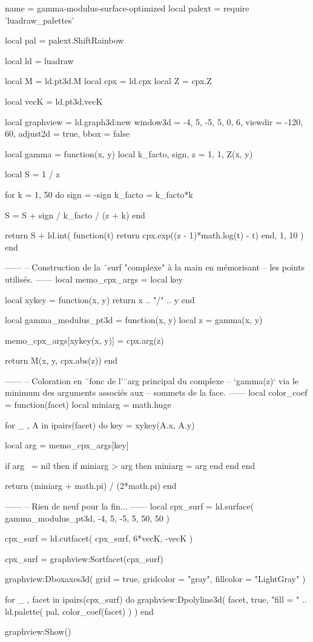\documentclass[border = 3pt]{standalone}
\begin{document}
\begin{luadraw*}{name = gamma-modulus-surface-optimized}
local palext = require 'luadraw_palettes'

local pal = palext.ShiftRainbow

local ld = luadraw

local M   = ld.pt3d.M
local cpx = ld.cpx
local Z   = cpx.Z

local vecK = ld.pt3d.vecK

local graphview = ld.graph3d:new{
  window3d = {-4, 5, -5, 5, 0, 6},
  viewdir  = {-120, 60},
  adjust2d = true,
  bbox     = false
}

local gamma = function(x, y)
  local k_facto, sign, z = 1, 1, Z(x, y)

  local S = 1 / z

  for k = 1, 50 do
    sign    = -sign
    k_facto = k_facto*k

    S = S + sign / k_facto / (z + k)
  end

  return S + ld.int(
    function(t)
      return cpx.exp((z - 1)*math.log(t) - t)
    end,
    1, 10
  )
end

------
-- Construction de la ¨surf "complexe" à la main en mémorisant
-- les points utilisés.
------
local memo_cpx_args = {}
local key

local xykey = function(x, y)
    return x .. "/" .. y
end

local gamma_modulus_pt3d = function(x, y)
  local z = gamma(x, y)

  memo_cpx_args[xykey(x, y)] = cpx.arg(z)

  return M(x, y, cpx.abs(z))
end

------
-- Coloration en ¨fonc de l'¨arg principal du complexe
-- `gamma(z)` via le minimum des arguments associés aux
-- sommets de la face.
------
local color_coef = function(facet)
  local miniarg = math.huge

  for _ , A in ipairs(facet) do
    key = xykey(A.x, A.y)

    local arg = memo_cpx_args[key]

    if arg ~= nil then
      if miniarg > arg then
        miniarg = arg
      end
    end
  end

  return (miniarg + math.pi) / (2*math.pi)
end

------
-- Rien de neuf pour la fin...
------
local cpx_surf = ld.surface(
  gamma_modulus_pt3d,
  -4, 5, -5, 5,
  {50, 50}
)

cpx_surf = ld.cutfacet(
  cpx_surf,
  {6*vecK, -vecK}
)

cpx_surf = graphview:Sortfacet(cpx_surf)

graphview:Dboxaxes3d({
  grid      = true,
  gridcolor = "gray",
  fillcolor = "LightGray"
})

for _ , facet in ipairs(cpx_surf) do
  graphview:Dpolyline3d(
    facet,
    true,
       "fill = "
    .. ld.palette(
          pal,
          color_coef(facet)
       )
  )
end

graphview:Show()
\end{luadraw*}
\end{document}
